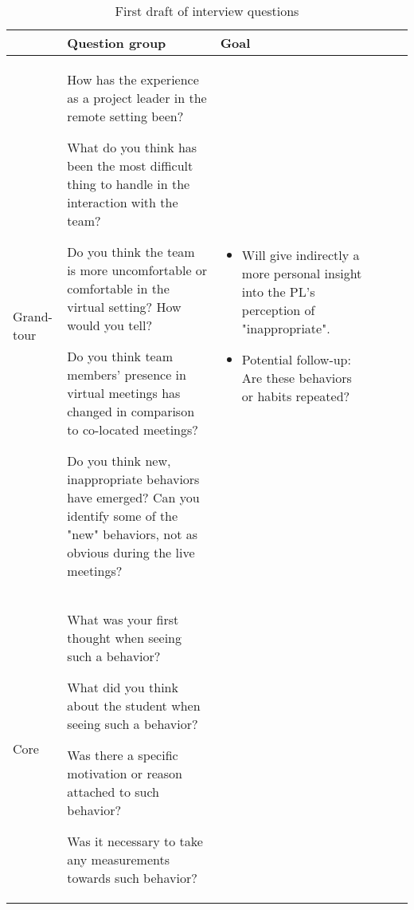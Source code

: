 \begin{table}[htpb]
  \caption[First draft of interview questions]{First draft of interview questions}\label{tab:interview}
  \centering
  \begin{tabular}{l p{}  l p{} l p{}}
    \toprule
      & Question group & Goal \\
    \midrule
     Grand-tour  & 
     How has the experience as a project leader in the remote setting been? 

What do you think has been the most difficult thing to handle in the interaction with the team?

Do you think the team is more uncomfortable or comfortable in the virtual setting? How would you tell?

Do you think team members' presence in virtual meetings has changed in comparison to co-located meetings?

Do you think new, inappropriate behaviors have emerged? Can you identify some of the "new" behaviors, not as obvious during the live meetings?
 & 
 \begin{minipage}[t]{0.4\textwidth}
    \begin{itemize}
    \item Will give indirectly a more personal insight into the PL's perception of "inappropriate".
    \item Potential follow-up: Are these behaviors or habits repeated?
    \end{itemize}
  \end{minipage}
   \\
     Core & 
  	What was your first thought when seeing such a behavior?

What did you think about the student when seeing such a behavior? 

Was there a specific motivation or reason attached to such behavior? 

Was it necessary to take any measurements towards such behavior?


\end{tabular}
\end{table}
